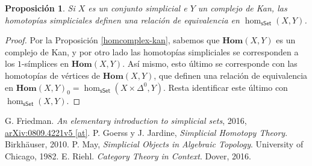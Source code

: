 \documentclass[11pt]{report}
\theoremstyle{colored}
\newtheorem{proposition}{Proposición}[section]
\newcommand{\cat}[1]{\mathsf{#1}}
\renewcommand{\ss}[1]{\Delta^{#1}}
\newcommand{\homcomplex}{\mathbf{Hom}}
\begin{document}
\begin{proposition} Si $X$ es un conjunto simplicial e $Y$ un complejo de Kan, las homotopías simpliciales definen una relación de equivalencia en $\hom_{\cat{sSet}}(X,Y)$.
\end{proposition}
\begin{proof} Por la Proposición \ref{homcomplex-kan}, sabemos que $\homcomplex(X,Y)$ es un complejo de Kan, y por otro lado las homotopías simpliciales se corresponden a los $1$-símplices en $\homcomplex(X,Y)$. Así mismo, esto último se corresponde con las homotopías de vértices de $\homcomplex(X,Y)$, que definen una relación de equivalencia en $\homcomplex(X,Y)_0 = \hom_{\cat{sSet}}(X \times \ss{0},Y)$. Resta identificar este último con $\hom_{\cat{sSet}}(X,Y)$. 
\end{proof}

\begin{thebibliography}{}
 G. Friedman. \textit{An elementary introduction to simplicial sets}, 2016, \href{https://arxiv.org/abs/0809.4221}{arXiv:0809.4221v5 [at]}.
 P. Goerss y J. Jardine, \textit{Simplicial Homotopy Theory}. Birkhäuser, 2010.
 P. May, \textit{Simplicial Objects in Algebraic Topology}. University of Chicago, 1982. 
 E. Riehl. \textit{Category Theory in Context}. Dover, 2016.
\end{thebibliography}
\end{document}
